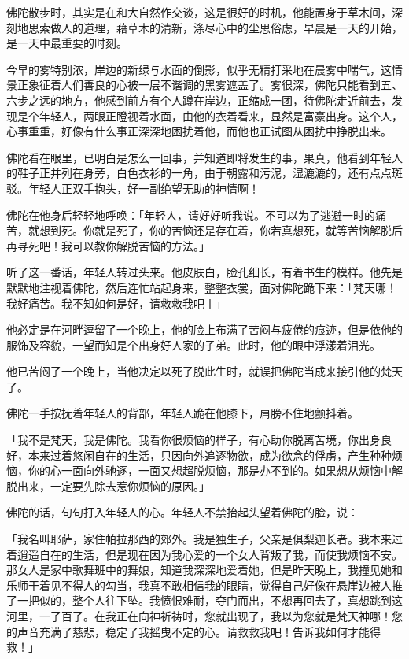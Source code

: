 \documentclass[twoside,openany]{book}
\begin{document}
佛陀散步时，其实是在和大自然作交谈，这是很好的时机，他能置身于草木间，深刻地思索做人的道理，藉草木的清新，涤尽心中的尘思俗虑，早晨是一天的开始，是一天中最重要的时刻。

今早的雾特别浓，岸边的新绿与水面的倒影，似乎无精打采地在晨雾中喘气，这情景正象征着人们善良的心被一层不谐调的黑雾遮盖了。雾很深，佛陀只能看到五、六步之远的地方，他感到前方有个人蹲在岸边，正缩成一团，待佛陀走近前去，发现是个年轻人，两眼正瞪视着水面，由他的衣着看来，显然是富豪出身。这个人，心事重重，好像有什么事正深深地困扰着他，而他也正试图从困扰中挣脱出来。

佛陀看在眼里，已明白是怎么一回事，并知道即将发生的事，果真，他看到年轻人的鞋子正并列在身旁，白色衣衫的一角，由于朝露和污泥，湿漉漉的，还有点点斑驳。年轻人正双手抱头，好一副绝望无助的神情啊！

佛陀在他身后轻轻地呼唤：「年轻人，请好好听我说。不可以为了逃避一时的痛苦，就想到死。你就是死了，你的苦恼还是存在着，你若真想死，就等苦恼解脱后再寻死吧！我可以教你解脱苦恼的方法。」

听了这一番话，年轻人转过头来。他皮肤白，脸孔细长，有着书生的模样。他先是默默地注视着佛陀，然后连忙站起身来，整整衣裳，面对佛陀跪下来：「梵天哪！我好痛苦。我不知如何是好，请救救我吧丨」

他必定是在河畔逗留了一个晚上，他的脸上布满了苦闷与疲倦的痕迹，但是依他的服饰及容貌，一望而知是个出身好人家的子弟。此时，他的眼中浮漾着泪光。

他已苦闷了一个晚上，当他决定以死了脱此生时，就误把佛陀当成来接引他的梵天了。

佛陀一手按抚着年轻人的背部，年轻人跪在他膝下，肩膀不住地颤抖着。

「我不是梵天，我是佛陀。我看你很烦恼的样子，有心助你脱离苦境，你出身良好，本来过着悠闲自在的生活，只因向外追逐物欲，成为欲念的俘虏，产生种种烦恼，你的心一面向外驰逐，一面又想超脱烦恼，那是办不到的。如果想从烦恼中解脱出来，一定要先除去惹你烦恼的原因。」

佛陀的话，句句打入年轻人的心。年轻人不禁抬起头望着佛陀的脸，说：

「我名叫耶萨，家住帕拉那西的郊外。我是独生子，父亲是俱梨迦长者。我本来过着逍遥自在的生活，但是现在因为我心爱的一个女人背叛了我，而使我烦恼不安。那女人是家中歌舞班中的舞娘，知道我深深地爱着她，但是昨天晚上，我撞见她和乐师干着见不得人的勾当，我真不敢相信我的眼睛，觉得自己好像在悬崖边被人推了一把似的，整个人往下坠。我愤恨难耐，夺门而出，不想再回去了，真想跳到这河里，一了百了。在我正在向神祈祷时，您就出现了，我以为您就是梵天神哪！您的声音充满了慈悲，稳定了我摇曳不定的心。请救救我吧！告诉我如何才能得救！」
\end{document}
